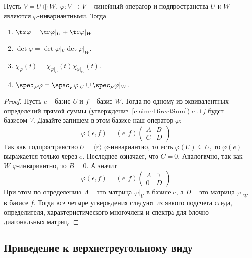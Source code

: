 \begin{claim}
\label{claim::RestrictionChar}
Пусть $V = U\oplus W$, $\varphi\colon V\to V$ -- линейный оператор и подпространства $U$ и $W$ являются $\varphi$-инвариантными.
Тогда
\begin{enumerate}
\item $\tr \varphi = \tr \varphi|_U + \tr \varphi|_W$.

\item $\det \varphi = \det \varphi|_U \det \varphi|_W$.

\item $\chi_\varphi(t) = \chi_{\varphi|_U}(t) \chi_{\varphi|_W}(t)$.

\item $\spec_F \varphi = \spec_F \varphi|_U \cup \spec_F \varphi|_W$.
\end{enumerate}
\end{claim}
\begin{proof}
Пусть $e$ -- базис $U$ и $f$ -- базис $W$.
Тогда по одному из эквивалентных определений прямой суммы (утверждение~\ref{claim::DirectSum}) $e \cup f$ будет базисом $V$.
Давайте запишем в этом базисе наш оператор $\varphi$:
\[
\varphi(e,f) = (e,f)
\begin{pmatrix}
{A}&{B}\\
{C}&{D}
\end{pmatrix}
\]
Так как подпространство $U =\langle r \rangle$ $\varphi$-инвариантно, то есть $\varphi(U)\subseteq U$, то $\varphi(e)$ выражается только через $e$.
Последнее означает, что $C = 0$.
Аналогично, так как $W$ $\varphi$-инвариантно, то $B = 0$.
А значит
\[
\varphi(e,f) = (e,f)
\begin{pmatrix}
{A}&{0}\\
{0}&{D}
\end{pmatrix}
\]
При этом по определению $A$ -- это матрица $\varphi|_U$ в базисе $e$, а $D$ -- это матрица $\varphi|_W$ в базисе $f$.
Тогда все четыре утверждения следуют из явного подсчета следа, определителя, характеристического многочлена и спектра для блочно диагональных матриц.
\end{proof}

\subsection{Приведение к верхнетреугольному виду}

